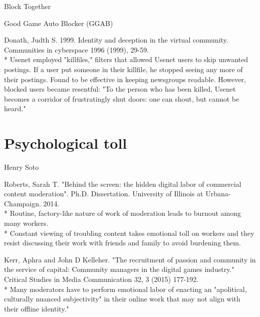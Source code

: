 \documentclass[class=book, crop=false]{standalone}
\begin{document}
Block Together

Good Game Auto Blocker (GGAB)

Donath, Judth S. 1999. Identity and deception in the virtual community. Communities in cyberspace 1996 (1999), 29-59.\\
 * Usenet employed "killfiles," filters that allowed Usenet users to skip unwanted postings. If a user put someone in their killfile, he stopped seeing any more of their postings. Found to be effective in keeping newsgroups readable. However, blocked users became resentful: "To the person who has been killed, Usenet becomes a corridor of frustratingly shut doors: one can shout, but cannot be heard."

\section{Psychological toll}

Henry Soto

Roberts, Sarah T. "Behind the screen: the hidden digital labor of commercial content moderation". Ph.D. Dissertation. University of Illinois at Urbana-Champaign. 2014.\\
 * Routine, factory-like nature of work of moderation leads to burnout among many workers.\\
 * Constant viewing of troubling content takes emotional toll on workers and they resist discussing their work with friends and family to avoid burdening them.

Kerr, Aphra and John D Kelleher. "The recruitment of passion and community in the service of capital: Community managers in the digital games industry." Critical Studies in Media Communication 32, 3 (2015) 177-192.\\
 * Many moderators have to perform emotional labor of enacting an "apolitical, culturally nuanced subjectivity" in their online work that may not align with their offline identity."
\end{document}
